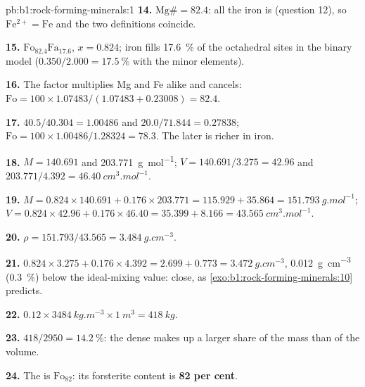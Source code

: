 \begin{solution}{pb:b1:rock-forming-minerals:1}
\textbf{14.} $\mathrm{Mg\#} = 82.4$: all the iron is 
(question 12), so $\mathrm{Fe^{2+}} = \mathrm{Fe}$ and the two definitions
coincide.

\textbf{15.} $\text{Fo}_{82.4}\text{Fa}_{17.6}$, $x = 0.824$; iron fills
\qty{17.6}{\percent} of the octahedral sites in the binary model
($0.350/2.000 = \qty{17.5}{\percent}$ with the minor elements).

\textbf{16.} The factor multiplies Mg and Fe alike and cancels:
$\mathrm{Fo} = 100\times1.07483/(1.07483 + 0.23008) = 82.4$.

\textbf{17.} $40.5/40.304 = 1.00486$ and $20.0/71.844 = 0.27838$;
$\mathrm{Fo} = 100\times1.00486/1.28324 = 78.3$. The later  is richer
in iron.

\textbf{18.} $M = 140.691$ and \qty{203.771}{g.mol^{-1}};
$V = 140.691/3.275 = 42.96$ and $203.771/4.392 =
\qty{46.40}{cm^3.mol^{-1}}$.

\textbf{19.} $M = 0.824\times140.691 + 0.176\times203.771 = 115.929 +
35.864 = \qty{151.793}{g.mol^{-1}}$; $V = 0.824\times42.96 +
0.176\times46.40 = 35.399 + 8.166 = \qty{43.565}{cm^3.mol^{-1}}$.

\textbf{20.} $\rho = 151.793/43.565 = \qty{3.484}{g.cm^{-3}}$.

\textbf{21.} $0.824\times3.275 + 0.176\times4.392 = 2.699 + 0.773 =
\qty{3.472}{g.cm^{-3}}$, \qty{0.012}{g.cm^{-3}} (\qty{0.3}{\percent}) below
the ideal-mixing value: close, as \cref{exo:b1:rock-forming-minerals:10}
predicts.

\textbf{22.} $0.12\times\qty{3484}{kg.m^{-3}}\times\qty{1}{m^3} =
\qty{418}{kg}$.

\textbf{23.} $418/2950 = \qty{14.2}{\percent}$: the dense  makes up a
larger share of the mass than of the volume.

\textbf{24.} The  is $\text{Fo}_{82}$: its forsterite content is
\textbf{82 per cent}.
\end{solution}
